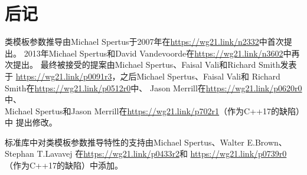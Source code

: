 \section{后记}
类模板参数推导由Michael Spertus于2007年在\url{https://wg21.link/n2332}中首次提出。
2013年Michael Spertus和David Vandevoorde在\url{https://wg21.link/n3602}中再次提出。
最终被接受的提案由Michael Spertus、Faisal Vali和Richard Smith发表于
\url{https://wg21.link/p0091r3}，之后Michael Spertus、Faisal Vali和
Richard Smith在\url{https://wg21.link/p0512r0}中、
Jason Merrill在\url{https://wg21.link/p0620r0}中、\\
Michael Spertus和Jason Merrill在\url{https://wg21.link/p702r1}（作为C++17的缺陷）中
提出修改。

标准库中对类模板参数推导特性的支持由Michael Spertus、Walter E.Brown、Stephan T.Lavavej
在\url{https://wg21.link/p0433r2}和
\url{https://wg21.link/p0739r0}（作为C++17的缺陷）中添加。